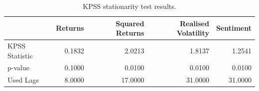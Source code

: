 \begin{table}[htbp]
\centering
\begin{tabular}{lrrrr}
\toprule
 & Returns & Squared Returns & Realised Volatility & Sentiment \\
\midrule
KPSS Statistic & 0.1832 & 2.0213 & 1.8137 & 1.2541 \\
p-value & 0.1000 & 0.0100 & 0.0100 & 0.0100 \\
Used Lags & 8.0000 & 17.0000 & 31.0000 & 31.0000 \\
\bottomrule
\end{tabular}
\caption{KPSS stationarity test results.}
\label{tab:kpss}
\end{table}
